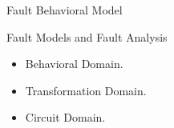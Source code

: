\documentclass[aspectratio=1610]{beamer}
\begin{document}
\begin{frame}{Fault Behavioral Model}
\vspace{-2.0cm}
\begin{block}{Fault Models and Fault Analysis}

\end{block}
\begin{itemize}
\item Behavioral Domain.

\item Transformation Domain.

\item Circuit Domain.
\end{itemize}







\end{frame}
\end{document}
